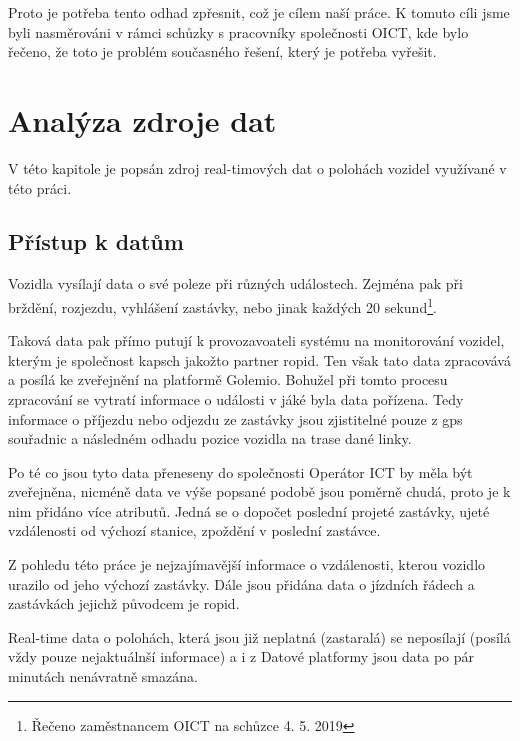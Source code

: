 Proto je potřeba tento odhad zpřesnit, což je cílem naší práce. K tomuto cíli jsme byli nasměrováni v rámci schůzky s pracovníky společnosti OICT, kde bylo řečeno, že toto je problém současného řešení, který je potřeba vyřešit.


\section{Analýza zdroje dat} \label{chapter:analyza_zdroje}

V této kapitole je popsán zdroj real-timových dat o polohách vozidel využívané v této práci.

\subsection{Přístup k datům}

Vozidla vysílají data o své poleze při různých událostech. Zejména pak při brždění, rozjezdu, vyhlášení zastávky, nebo jinak každých 20 sekund\footnote{Řečeno zaměstnancem OICT na schůzce 4. 5. 2019}.

\bigbreak

Taková data pak přímo putují k provozavoateli systému na monitorování vozidel, kterým je společnost \gls{kapsch} jakožto partner \gls{ropid}. Ten však tato data zpracovává a posílá ke zveřejnění na platformě Golemio. Bohužel při tomto procesu zpracování se vytratí informace o události v jáké byla data pořízena. Tedy informace o příjezdu nebo odjezdu ze zastávky jsou zjistitelné pouze z \gls{gps} souřadnic a následném odhadu pozice vozidla na trase dané linky.

\bigbreak

Po té co jsou tyto data přeneseny do společnosti Operátor ICT by měla být zveřejněna, nicméně data ve výše popsané podobě jsou poměrně chudá, proto je k nim přidáno více atributů. Jedná se o dopočet poslední projeté zastávky, ujeté vzdálenosti od výchozí stanice, zpoždění v poslední zastávce.

\bigbreak

 Z pohledu této práce je nejzajímavější informace o vzdálenosti, kterou vozidlo urazilo od jeho výchozí zastávky. Dále jsou přidána data o jízdních řádech a zastávkách jejichž původcem je \gls{ropid}.

\bigbreak

Real-time data o polohách, která jsou již neplatná (zastaralá) se neposílají (posílá vždy pouze nejaktuálnší informace) a i z Datové platformy jsou data po pár minutách nenávratně smazána.


